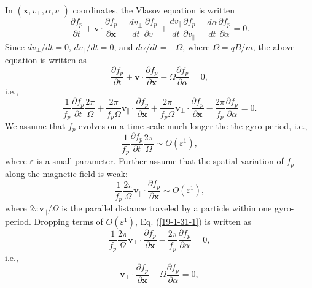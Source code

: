 \documentclass{llncs}
\begin{document}
In $(\mathbf{x}, v_{\perp}, \alpha, v_{\parallel})$ coordinates, the Vlasov
equation is written
\begin{equation}
  \frac{\partial f_p}{\partial t} +\mathbf{v} \cdot \frac{\partial
  f_p}{\partial \mathbf{x}} + \frac{d v_{\perp}}{d t} \frac{\partial
  f_p}{\partial v_{\perp}} + \frac{d v_{\parallel}}{d t} \frac{\partial
  f_p}{\partial v_{\parallel}} + \frac{d \alpha}{d t} \frac{\partial
  f_p}{\partial \alpha} = 0.
\end{equation}
Since $d v_{\perp} / d t = 0$, $d v_{\parallel} / d t = 0$, and $d \alpha / d
t = - \Omega$, where $\Omega = q B / m$, the above equation is written as
\begin{equation}
  \frac{\partial f_p}{\partial t} +\mathbf{v} \cdot \frac{\partial
  f_p}{\partial \mathbf{x}} - \Omega \frac{\partial f_p}{\partial \alpha} = 0,
\end{equation}
i.e.,
\begin{equation}
  \label{19-1-31-1} \frac{1}{f_p}  \frac{\partial f_p}{\partial t} \frac{2
  \pi}{\Omega} + \frac{2 \pi}{f_p \Omega} \mathbf{v}_{\parallel} \cdot
  \frac{\partial f_p}{\partial \mathbf{x}} + \frac{2 \pi}{f_p \Omega}
  \mathbf{v}_{\perp} \cdot \frac{\partial f_p}{\partial \mathbf{x}} - \frac{2
  \pi}{f_p} \frac{\partial f_p}{\partial \alpha} = 0.
\end{equation}
We assume that $f_p$ evolves on a time scale much longer the the gyro-period,
i.e.,
\begin{equation}
  \frac{1}{f_p}  \frac{\partial f_p}{\partial t} \frac{2 \pi}{\Omega} \sim O
  (\varepsilon^1),
\end{equation}
where $\varepsilon$ is a small parameter. Further assume that the spatial
variation of $f_p$ along the magnetic field is weak:
\begin{equation}
  \frac{1}{f_p}  \frac{2 \pi}{\Omega} \mathbf{v}_{\parallel} \cdot
  \frac{\partial f_p}{\partial \mathbf{x}} \sim O (\varepsilon^1),
\end{equation}
where $2 \pi \mathbf{v}_{\parallel} / \Omega$ is the parallel distance
traveled by a particle within one gyro-period. Dropping terms of $O
(\varepsilon^1)$, Eq. (\ref{19-1-31-1}) is written as
\begin{equation}
  \frac{1}{f_p} \frac{2 \pi}{\Omega} \mathbf{v}_{\perp} \cdot \frac{\partial
  f_p}{\partial \mathbf{x}} - \frac{2 \pi}{f_p} \frac{\partial f_p}{\partial
  \alpha} = 0,
\end{equation}
i.e.,
\begin{equation}
  \mathbf{v}_{\perp} \cdot \frac{\partial f_p}{\partial \mathbf{x}} - \Omega
  \frac{\partial f_p}{\partial \alpha} = 0,
\end{equation}
\end{document}
